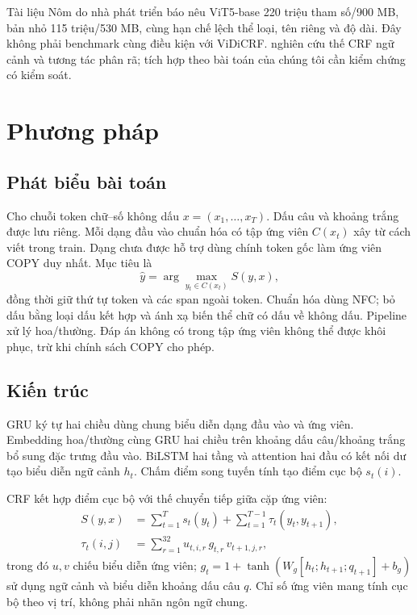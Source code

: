 \documentclass{article}
\begin{document}
Tài liệu Nôm do nhà phát triển báo \citep{nom2026} nêu ViT5-base 220 triệu tham số/900 MB, bản nhỏ 115 triệu/530 MB, cùng hạn chế lệch thể loại, tên riêng và độ dài. Đây không phải benchmark cùng điều kiện với ViDiCRF. \citet{hu2020} nghiên cứu thế CRF ngữ cảnh và tương tác phân rã; tích hợp theo bài toán của chúng tôi cần kiểm chứng có kiểm soát.

\section{Phương pháp}
\subsection{Phát biểu bài toán}
Cho chuỗi token chữ--số không dấu $x=(x_1,\ldots,x_T)$. Dấu câu và khoảng trắng được lưu riêng. Mỗi dạng đầu vào chuẩn hóa có tập ứng viên $C(x_t)$ xây từ cách viết trong train. Dạng chưa được hỗ trợ dùng chính token gốc làm ứng viên COPY duy nhất. Mục tiêu là
\begin{equation}
\hat y=\arg\max_{y_t\in C(x_t)} S(y,x),
\end{equation}
đồng thời giữ thứ tự token và các span ngoài token. Chuẩn hóa dùng NFC; bỏ dấu bằng loại dấu kết hợp và ánh xạ biến thể chữ có dấu về không dấu. Pipeline xử lý hoa/thường. Đáp án không có trong tập ứng viên không thể được khôi phục, trừ khi chính sách COPY cho phép.

\subsection{Kiến trúc}
GRU ký tự hai chiều dùng chung biểu diễn dạng đầu vào và ứng viên. Embedding hoa/thường cùng GRU hai chiều trên khoảng dấu câu/khoảng trắng bổ sung đặc trưng đầu vào. BiLSTM hai tầng và attention hai đầu có kết nối dư tạo biểu diễn ngữ cảnh $h_t$. Chấm điểm song tuyến tính tạo điểm cục bộ $s_t(i)$.

CRF kết hợp điểm cục bộ với thế chuyển tiếp giữa cặp ứng viên:
\begin{align}
S(y,x)&=\sum_{t=1}^{T}s_t(y_t)+\sum_{t=1}^{T-1}\tau_t(y_t,y_{t+1}),\\
\tau_t(i,j)&=\sum_{r=1}^{32}u_{t,i,r}\,g_{t,r}\,v_{t+1,j,r},
\end{align}
trong đó $u,v$ chiếu biểu diễn ứng viên; $g_t=1+\tanh(W_g[h_t;h_{t+1};q_{t+1}]+b_g)$ sử dụng ngữ cảnh và biểu diễn khoảng dấu câu $q$. Chỉ số ứng viên mang tính cục bộ theo vị trí, không phải nhãn ngôn ngữ chung.
\end{document}
